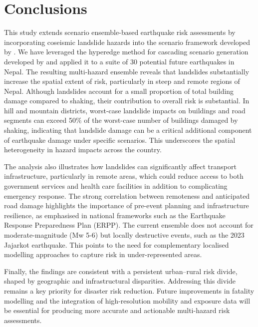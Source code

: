 \documentclass[preprint,12pt,authoryear]{elsarticle}
\begin{document}
\section{Conclusions}

This study extends scenario ensemble-based earthquake risk assessments by incorporating coseismic landslide hazards into the scenario framework developed by \cite{Robinson2018}. We have leveraged the hyperedge method for cascading scenario generation developed by \cite{Dunant2025} and applied it to a suite of 30 potential future earthquakes in Nepal. The resulting multi-hazard ensemble reveals that landslides substantially increase the spatial extent of risk, particularly in steep and remote regions of Nepal. Although landslides account for a small proportion of total building damage compared to shaking, their contribution to overall risk is substantial. In hill and mountain districts, worst-case landslide impacts on buildings and road segments can exceed 50\% of the worst-case number of buildings damaged by shaking, indicating that landslide damage can be a critical additional component of earthquake damage under specific scenarios. This underscores the spatial heterogeneity in hazard impacts across the country.

The analysis also illustrates how landslides can significantly affect transport infrastructure, particularly in remote areas, which could reduce access to both government services and health care facilities in addition to complicating emergency response. The strong correlation between remoteness and anticipated road damage highlights the importance of pre-event planning and infrastructure resilience, as emphasised in national frameworks such as the Earthquake Response Preparedness Plan (ERPP). The current ensemble does not account for moderate-magnitude (Mw 5-6) but locally destructive events, such as the 2023 Jajarkot earthquake. This points to the need for complementary localised modelling approaches to capture risk in under-represented areas.

Finally, the findings are consistent with a persistent urban--rural risk divide, shaped by geographic and infrastructural disparities. Addressing this divide remains a key priority for disaster risk reduction. Future improvements in fatality modelling and the integration of high-resolution mobility and exposure data will be essential for producing more accurate and actionable multi-hazard risk assessments.
\end{document}
